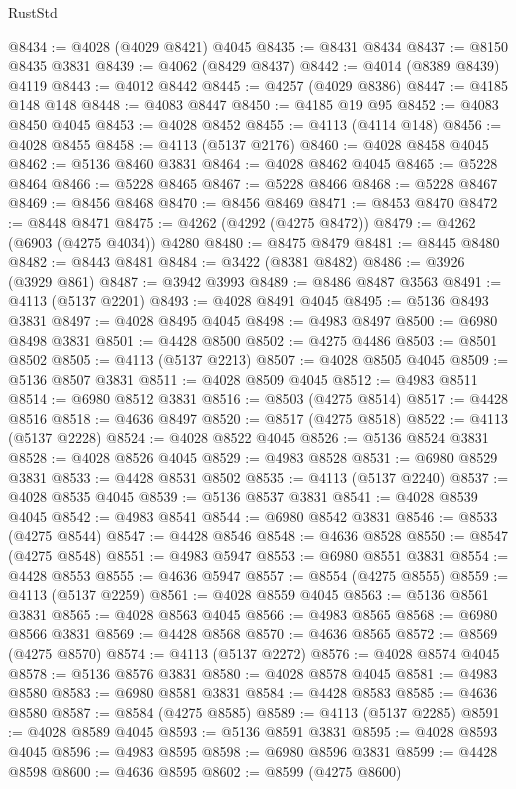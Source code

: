 \begin{lexlean}{RustStd}
\begin{coremodule}
@8434 := @4028 (@4029 @8421) @4045
@8435 := @8431 @8434
@8437 := @8150 @8435 @3831
@8439 := @4062 (@8429 @8437)
@8442 := @4014 (@8389 @8439) @4119
@8443 := @4012 @8442
@8445 := @4257 (@4029 @8386)
@8447 := @4185 @148 @148
@8448 := @4083 @8447
@8450 := @4185 @19 @95
@8452 := @4083 @8450 @4045
@8453 := @4028 @8452
@8455 := @4113 (@4114 @148)
@8456 := @4028 @8455
@8458 := @4113 (@5137 @2176)
@8460 := @4028 @8458 @4045
@8462 := @5136 @8460 @3831
@8464 := @4028 @8462 @4045
@8465 := @5228 @8464
@8466 := @5228 @8465
@8467 := @5228 @8466
@8468 := @5228 @8467
@8469 := @8456 @8468
@8470 := @8456 @8469
@8471 := @8453 @8470
@8472 := @8448 @8471
@8475 := @4262 (@4292 (@4275 @8472))
@8479 := @4262 (@6903 (@4275 @4034)) @4280
@8480 := @8475 @8479
@8481 := @8445 @8480
@8482 := @8443 @8481
@8484 := @3422 (@8381 @8482)
@8486 := @3926 (@3929 @861)
@8487 := @3942 @3993
@8489 := @8486 @8487 @3563
@8491 := @4113 (@5137 @2201)
@8493 := @4028 @8491 @4045
@8495 := @5136 @8493 @3831
@8497 := @4028 @8495 @4045
@8498 := @4983 @8497
@8500 := @6980 @8498 @3831
@8501 := @4428 @8500
@8502 := @4275 @4486
@8503 := @8501 @8502
@8505 := @4113 (@5137 @2213)
@8507 := @4028 @8505 @4045
@8509 := @5136 @8507 @3831
@8511 := @4028 @8509 @4045
@8512 := @4983 @8511
@8514 := @6980 @8512 @3831
@8516 := @8503 (@4275 @8514)
@8517 := @4428 @8516
@8518 := @4636 @8497
@8520 := @8517 (@4275 @8518)
@8522 := @4113 (@5137 @2228)
@8524 := @4028 @8522 @4045
@8526 := @5136 @8524 @3831
@8528 := @4028 @8526 @4045
@8529 := @4983 @8528
@8531 := @6980 @8529 @3831
@8533 := @4428 @8531 @8502
@8535 := @4113 (@5137 @2240)
@8537 := @4028 @8535 @4045
@8539 := @5136 @8537 @3831
@8541 := @4028 @8539 @4045
@8542 := @4983 @8541
@8544 := @6980 @8542 @3831
@8546 := @8533 (@4275 @8544)
@8547 := @4428 @8546
@8548 := @4636 @8528
@8550 := @8547 (@4275 @8548)
@8551 := @4983 @5947
@8553 := @6980 @8551 @3831
@8554 := @4428 @8553
@8555 := @4636 @5947
@8557 := @8554 (@4275 @8555)
@8559 := @4113 (@5137 @2259)
@8561 := @4028 @8559 @4045
@8563 := @5136 @8561 @3831
@8565 := @4028 @8563 @4045
@8566 := @4983 @8565
@8568 := @6980 @8566 @3831
@8569 := @4428 @8568
@8570 := @4636 @8565
@8572 := @8569 (@4275 @8570)
@8574 := @4113 (@5137 @2272)
@8576 := @4028 @8574 @4045
@8578 := @5136 @8576 @3831
@8580 := @4028 @8578 @4045
@8581 := @4983 @8580
@8583 := @6980 @8581 @3831
@8584 := @4428 @8583
@8585 := @4636 @8580
@8587 := @8584 (@4275 @8585)
@8589 := @4113 (@5137 @2285)
@8591 := @4028 @8589 @4045
@8593 := @5136 @8591 @3831
@8595 := @4028 @8593 @4045
@8596 := @4983 @8595
@8598 := @6980 @8596 @3831
@8599 := @4428 @8598
@8600 := @4636 @8595
@8602 := @8599 (@4275 @8600)

\end{coremodule}
\end{lexlean}
